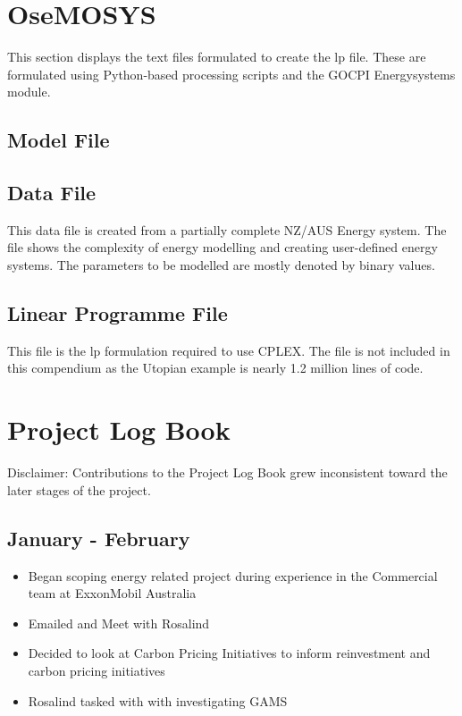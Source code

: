 \documentclass[12pt]{article}
\begin{document}
\section{OseMOSYS}
This section displays the text files formulated to create the lp file.
These are formulated using Python-based processing scripts and the GOCPI Energysystems module.
\subsection{Model File}

\subsection{Data File}
This data file is created from a partially complete NZ/AUS Energy system.
The file shows the complexity of energy modelling and creating user-defined energy systems.
The parameters to be modelled are mostly denoted by binary values.

\subsection{Linear Programme File}
This file is the lp formulation required to use CPLEX.
The file is not included in this compendium as the Utopian example is nearly 1.2 million lines of code.

\section{Project Log Book}
Disclaimer: Contributions to the Project Log Book grew inconsistent toward the later stages of the project.
\subsection*{January - February}
\begin{itemize}
	\item Began scoping energy related project during experience in the Commercial team at ExxonMobil Australia
	\item Emailed and Meet with Rosalind
	\item Decided to look at Carbon Pricing Initiatives to inform reinvestment and carbon pricing initiatives
	\item Rosalind tasked with with investigating GAMS
\end{itemize}
\end{document}
